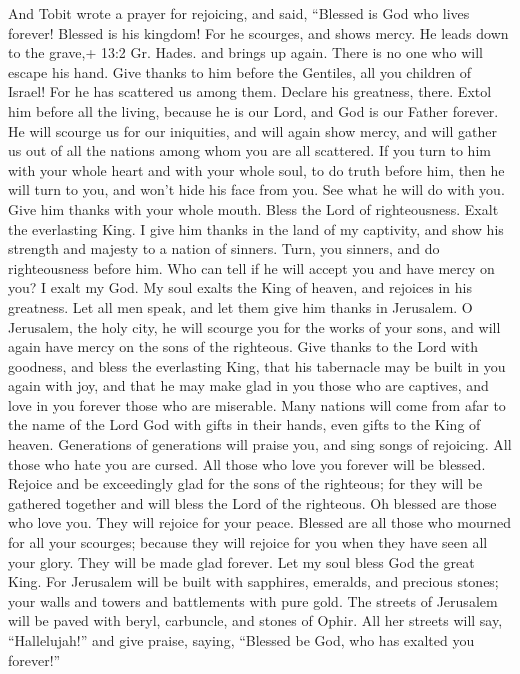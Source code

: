  And Tobit wrote a prayer for rejoicing, and said, ``Blessed
is God who lives forever! Blessed is his kingdom!  For he
scourges, and shows mercy. He leads down to the grave,+ 13:2 Gr. Hades.
and brings up again. There is no one who will escape his hand.
 Give thanks to him before the Gentiles, all you children of
Israel! For he has scattered us among them.  Declare his
greatness, there. Extol him before all the living, because he is our
Lord, and God is our Father forever.  He will scourge us for
our iniquities, and will again show mercy, and will gather us out of all
the nations among whom you are all scattered.  If you turn
to him with your whole heart and with your whole soul, to do truth
before him, then he will turn to you, and won't hide his face from you.
See what he will do with you. Give him thanks with your whole mouth.
Bless the Lord of righteousness. Exalt the everlasting King. I give him
thanks in the land of my captivity, and show his strength and majesty to
a nation of sinners. Turn, you sinners, and do righteousness before him.
Who can tell if he will accept you and have mercy on you?  I
exalt my God. My soul exalts the King of heaven, and rejoices in his
greatness.  Let all men speak, and let them give him thanks
in Jerusalem.  O Jerusalem, the holy city, he will scourge
you for the works of your sons, and will again have mercy on the sons of
the righteous.  Give thanks to the Lord with goodness, and
bless the everlasting King, that his tabernacle may be built in you
again with joy, and that he may make glad in you those who are captives,
and love in you forever those who are miserable.  Many
nations will come from afar to the name of the Lord God with gifts in
their hands, even gifts to the King of heaven. Generations of
generations will praise you, and sing songs of rejoicing. 
All those who hate you are cursed. All those who love you forever will
be blessed.  Rejoice and be exceedingly glad for the sons
of the righteous; for they will be gathered together and will bless the
Lord of the righteous.  Oh blessed are those who love you.
They will rejoice for your peace. Blessed are all those who mourned for
all your scourges; because they will rejoice for you when they have seen
all your glory. They will be made glad forever.  Let my
soul bless God the great King.  For Jerusalem will be built
with sapphires, emeralds, and precious stones; your walls and towers and
battlements with pure gold.  The streets of Jerusalem will
be paved with beryl, carbuncle, and stones of Ophir.  All
her streets will say, ``Hallelujah!'' and give praise, saying, ``Blessed
be God, who has exalted you forever!''

